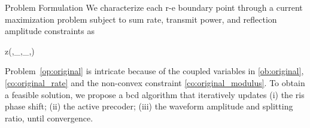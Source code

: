 \begin{section}{Problem Formulation}\label{se:problem_formulation}
	We characterize each \gls{r-e} boundary point through a current maximization problem subject to sum rate, transmit power, and reflection amplitude constraints as
	\begin{maxi!}
		{}{z(\mathbf{\phi},_{},_{},\rho)}{\label{op:original}}{\label{ob:original}}
		\label{co:original_rate}
		\label{co:original_power}
		\label{co:original_modulus}
	\end{maxi!}
	Problem~\eqref{op:original} is intricate because of the coupled variables in \eqref{ob:original}, \eqref{co:original_rate} and the non-convex constraint \eqref{co:original_modulus}. To obtain a feasible solution, we propose a \gls{bcd} algorithm that iteratively updates (i) the \gls{ris} phase shift; (ii) the active precoder; (iii) the waveform amplitude and splitting ratio, until convergence.



\end{section}
